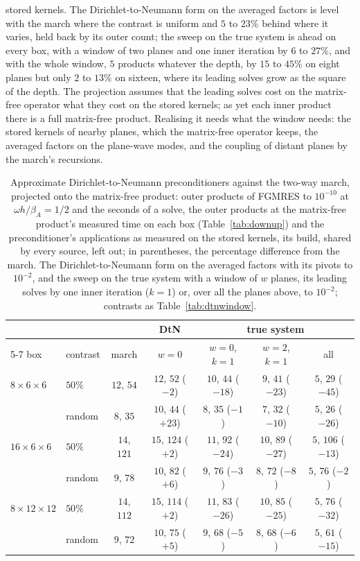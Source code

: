 \documentclass[11pt,a4paper]{article}
\begin{document}
stored kernels. The Dirichlet-to-Neumann form on the averaged factors is level with the march where the contrast is
uniform and $5$ to $23\%$ behind where it varies, held back by its outer count; the sweep on the true system is
ahead on every box, with a window of two planes and one inner iteration by $6$ to $27\%$, and with the whole
window, $5$ products whatever the depth, by $15$ to $45\%$ on eight planes but only $2$ to $13\%$ on sixteen, where
its leading solves grow as the square of the depth. The projection assumes that the leading solves cost on the
matrix-free operator what they cost on the stored kernels; as yet each inner product there is a full matrix-free
product. Realising it needs what the window needs: the stored kernels of nearby planes, which the matrix-free
operator keeps, the averaged factors on the plane-wave modes, and the coupling of distant planes by the march's
recursions.

\begin{table}[htbp]
\centering
\caption{Approximate Dirichlet-to-Neumann preconditioners against the two-way march, projected onto the
matrix-free product: outer products of FGMRES to $10^{-10}$ at $\omega h/\beta_A=1/2$ and the seconds of a solve,
the outer products at the matrix-free product's measured time on each box (Table~\ref{tab:downup}) and the
preconditioner's applications as measured on the stored kernels, its build, shared by every source, left out; in
parentheses, the percentage difference from the march. The Dirichlet-to-Neumann form on the averaged factors with
its pivots to $10^{-2}$, and the sweep on the true system with a window of $w$ planes, its leading solves by one
inner iteration ($k=1$) or, over all the planes above, to $10^{-2}$; contrasts as Table~\ref{tab:dtnwindow}.}
\label{tab:dtnapprox}
\setlength{\tabcolsep}{4pt}
\begin{tabular}{llccccc}
\toprule
 & & & DtN & \multicolumn{3}{c}{true system} \\
\cmidrule(lr){5-7}
box & contrast & march & $w=0$ & $w=0$, $k=1$ & $w=2$, $k=1$ & all \\
\midrule
$8\times6\times6$ & $50\%$ & $12$, $54$ & $12$, $52$ ($-2$) & $10$, $44$ ($-18$) & $9$, $41$ ($-23$) & $5$, $29$ ($-45$) \\
 & random & $8$, $35$ & $10$, $44$ (${+}23$) & $8$, $35$ ($-1$) & $7$, $32$ ($-10$) & $5$, $26$ ($-26$) \\
$16\times6\times6$ & $50\%$ & $14$, $121$ & $15$, $124$ (${+}2$) & $11$, $92$ ($-24$) & $10$, $89$ ($-27$) & $5$, $106$ ($-13$) \\
 & random & $9$, $78$ & $10$, $82$ (${+}6$) & $9$, $76$ ($-3$) & $8$, $72$ ($-8$) & $5$, $76$ ($-2$) \\
$8\times12\times12$ & $50\%$ & $14$, $112$ & $15$, $114$ (${+}2$) & $11$, $83$ ($-26$) & $10$, $85$ ($-25$) & $5$, $76$ ($-32$) \\
 & random & $9$, $72$ & $10$, $75$ (${+}5$) & $9$, $68$ ($-5$) & $8$, $68$ ($-6$) & $5$, $61$ ($-15$) \\
\bottomrule
\end{tabular}
\end{table}
\end{document}
